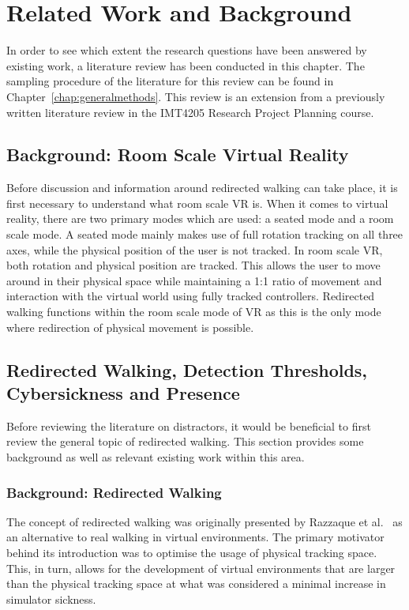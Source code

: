 \chapter{Related Work and Background}\label{chap:relatedWork}
In order to see which extent the research questions have been answered by existing work, a literature review has been conducted in this chapter. The sampling procedure of the literature for this review can be found in Chapter~\ref{chap:generalmethods}. This review is an extension from a previously written literature review in the IMT4205 Research Project Planning course. 

\section{Background: Room Scale Virtual Reality}
Before discussion and information around redirected walking can take place, it is first necessary to understand what room scale VR is. When it comes to virtual reality, there are two primary modes which are used: a seated mode and a room scale mode. A seated mode mainly makes use of full rotation tracking on all three axes, while the physical position of the user is not tracked. In room scale VR, both rotation and physical position are tracked. This allows the user to move around in their physical space while maintaining a 1:1 ratio of movement and interaction with the virtual world using fully tracked controllers. Redirected walking functions within the room scale mode of VR as this is the only mode where redirection of physical movement is possible. 

\section{Redirected Walking, Detection Thresholds, Cybersickness and Presence}
Before reviewing the literature on distractors, it would be beneficial to first review the general topic of redirected walking. This section provides some background as well as relevant existing work within this area.

\subsection{Background: Redirected Walking}
The concept of redirected walking was originally presented by Razzaque et al.~\cite{razzaque2001redirected} as an alternative to real walking in virtual environments. The primary motivator behind its introduction was to optimise the usage of physical tracking space. This, in turn, allows for the development of virtual environments that are larger than the physical tracking space at what was considered a minimal increase in simulator sickness. 


